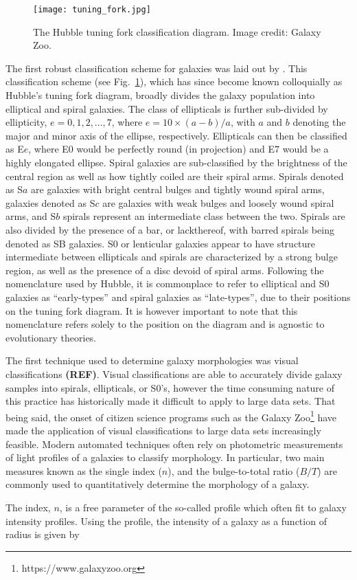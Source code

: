 \begin{figure}[!ht]
  \centering
  \texttt{[image: tuning\_fork.jpg]}
  \caption[The Hubble tuning fork classification diagram]{The Hubble
    tuning fork classification diagram.  Image 
    credit: Galaxy Zoo.}
  \label{fig:tuning_fork}
\end{figure}

The first robust classification scheme for galaxies was laid out by
\citet{hubble1926}.  This classification scheme (see
Fig.~\ref{fig:tuning_fork}), which has since become known colloquially
as Hubble's tuning fork diagram, broadly divides the galaxy
population into elliptical and spiral galaxies.  The class of
ellipticals is further sub-divided by ellipticity, $e = 0,1,2,...,7$,
where $e = 10 \times (a-b)/a$, with $a$ and $b$ denoting the major and
minor axis of the ellipse, respectively.  Ellipticals can then be
classified as E$e$, where E$0$ would be perfectly round (in
projection) and E$7$ would be a highly elongated ellipse.  Spiral
galaxies are sub-classified by the brightness of the central region as
well as how tightly coiled are their spiral arms.  Spirals denoted as
S$a$ are galaxies with bright central bulges and tightly wound spiral
arms, galaxies denoted as S$c$ are galaxies with weak bulges and
loosely wound spiral arms, and S$b$ spirals represent an intermediate
class between the two.  Spirals are also divided by the presence of a
bar, or lackthereof, with barred spirals being denoted as SB galaxies.
S$0$ or lenticular galaxies appear to have structure intermediate
between ellipticals and spirals are characterized by a strong bulge
region, as well as the presence of a disc devoid of spiral arms.
Following the nomenclature used by Hubble, it is commonplace to refer
to elliptical and S0 galaxies as ``early-types'' and spiral galaxies
as ``late-types'', due to their positions on the tuning fork diagram.
It is however important to note that this nomenclature refers solely
to the position on the diagram and is agnostic to evolutionary
theories.
\par
The first technique used to determine galaxy morphologies was visual
classifications \textbf{(REF)}.  Visual classifications are able to
accurately divide galaxy samples into spirals, ellipticals, or S0's,
however the time consuming nature of this practice has historically
made it difficult to apply to large data sets.  That being said, the
onset of citizen science programs such as the Galaxy
Zoo\footnote{https://www.galaxyzoo.org} \citep{lintott2008} have made
the application of visual classifications to large data sets
increasingly feasible.  Modern automated techniques often rely on photometric measurements of 
light profiles of a galaxies to classify morphology.  In particular, two
main measures known as the single \ser index ($n$), and the
bulge-to-total ratio ($B/T$) are commonly used to quantitatively determine
the morphology of a galaxy.
\par
The \ser index, $n$, is a free parameter of the so-called
\ser profile \citep{sersic1968} which often fit to galaxy
intensity profiles.  Using the \ser profile, the intensity of a
galaxy as a function of radius is given by 

